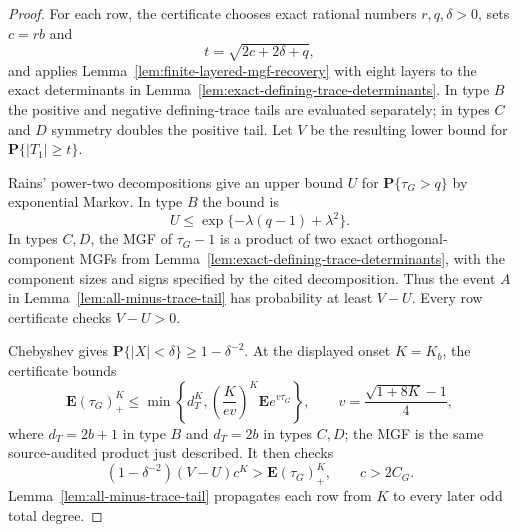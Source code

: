 \documentclass[11pt,reqno]{amsart}
\theoremstyle{plain}
\theoremstyle{definition}
\begin{document}
\begin{proof}
For each row, the certificate chooses exact rational numbers
$r,q,\delta>0$, sets $c=rb$ and
\[
 t=\sqrt{2c+2\delta+q},
\]
and applies Lemma~\ref{lem:finite-layered-mgf-recovery} with eight layers to
the exact determinants in
Lemma~\ref{lem:exact-defining-trace-determinants}.  In type $B$ the positive
and negative defining-trace tails are evaluated separately; in types $C$
and $D$ symmetry doubles the positive tail.  Let $V$ be the resulting lower
bound for $\mathbf P\{|T_1|\geq t\}$.

Rains' power-two decompositions
\cite[Theorem~1.5, equations~(22), (23), and (36)]{RainsPowerMaps} give an
upper bound $U$ for $\mathbf P\{\tau_G>q\}$ by exponential Markov.  In type
$B$ the bound is
\[
 U\leq\exp\{-\lambda(q-1)+\lambda^2\}.
\]
In types $C,D$, the MGF of $\tau_G-1$ is a product of two exact
orthogonal-component MGFs from
Lemma~\ref{lem:exact-defining-trace-determinants}, with the component sizes
and signs specified by the cited decomposition.  Thus the event $A$ in
Lemma~\ref{lem:all-minus-trace-tail} has probability at least $V-U$.
Every row certificate checks $V-U>0$.

Chebyshev gives $\mathbf P\{|X|<\delta\}\geq1-\delta^{-2}$.  At the
displayed onset $K=K_b$, the certificate bounds
\[
 \mathbf E(\tau_G)_+^K
 \leq\min\left\{d_T^K,
 \left(\frac{K}{ev}\right)^K\mathbf Ee^{v\tau_G}\right\},
 \qquad
 v=\frac{\sqrt{1+8K}-1}{4},
\]
where $d_T=2b+1$ in type $B$ and $d_T=2b$ in types $C,D$; the MGF is the
same source-audited product just described.  It then checks
\begin{equation}
\label{eq:remaining-directed-tail-test}
 (1-\delta^{-2})(V-U)c^K>\mathbf E(\tau_G)_+^K,
 \qquad c>2C_G.
\end{equation}
Lemma~\ref{lem:all-minus-trace-tail} propagates each row from $K$ to every
later odd total degree.


\end{proof}
\end{document}
